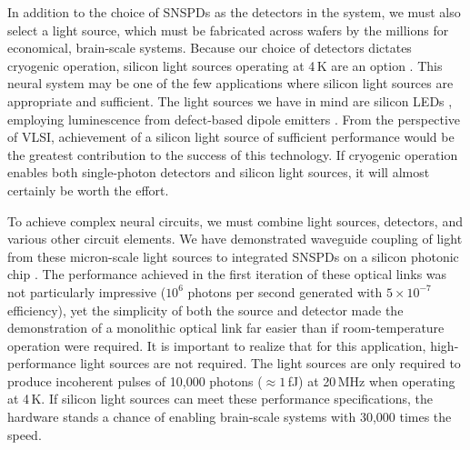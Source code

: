\documentclass[twocolumn]{article}
\begin{document}
In addition to the choice of SNSPDs as the detectors in the system, we must also select a light source, which must be fabricated across wafers by the millions for economical, brain-scale systems. Because our choice of detectors dictates cryogenic operation, silicon light sources operating at 4\,K are an option \cite{da1989,shxu2007}. This neural system may be one of the few applications where silicon light sources are appropriate and sufficient. The light sources we have in mind are silicon LEDs \cite{buch2017}, employing luminescence from defect-based dipole emitters \cite{dali1987,absa2018}. From the perspective of VLSI, achievement of a silicon light source of sufficient performance would be the greatest contribution to the success of this technology. If cryogenic operation enables both single-photon detectors and silicon light sources, it will almost certainly be worth the effort.

To achieve complex neural circuits, we must combine light sources, detectors, and various other circuit elements. We have demonstrated waveguide coupling of light from these micron-scale light sources to integrated SNSPDs on a silicon photonic chip \cite{buch2017}. The performance achieved in the first iteration of these optical links was not particularly impressive ($10^6$ photons per second generated with $5\times10^{-7}$ efficiency), yet the simplicity of both the source and detector made the demonstration of a monolithic optical link far easier than if room-temperature operation were required. It is important to realize that for this application, high-performance light sources are not required. The light sources are only required to produce incoherent pulses of 10,000 photons ($\approx 1$\,fJ) at 20\,MHz when operating at 4\,K. If silicon light sources can meet these performance specifications, the hardware stands a chance of enabling brain-scale systems with 30,000 times the speed.
\end{document}
